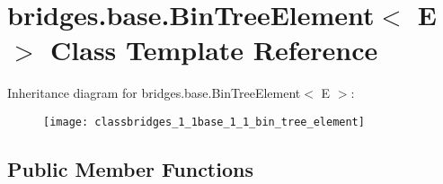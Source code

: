 \hypertarget{classbridges_1_1base_1_1_bin_tree_element}{}\section{bridges.\+base.\+Bin\+Tree\+Element$<$ E $>$ Class Template Reference}
\label{classbridges_1_1base_1_1_bin_tree_element}
Inheritance diagram for bridges.\+base.\+Bin\+Tree\+Element$<$ E $>$\+:\begin{figure}[H]
\begin{center}
\leavevmode
\texttt{[image: classbridges\_1\_1base\_1\_1\_bin\_tree\_element]}
\end{center}
\end{figure}
\subsection*{Public Member Functions}
